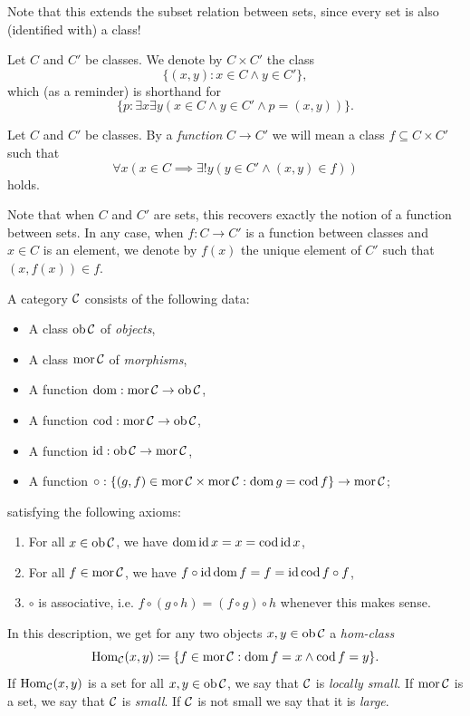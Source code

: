 Note that this extends the subset relation between sets, since every set is also (identified with) a class!

\begin{definition}\label{def:appendix:size issues:product of classes}
    Let $C$ and $C'$ be classes. We denote by $C \times C'$ the class
    \[\{(x,y) : x \in C \land y \in C'\},\]
    which (as a reminder) is shorthand for
    \[\{p : \exists x \exists y (x \in C \land y \in C' \land p = (x,y))\}.\]
\end{definition}

\begin{definition}\label{def:appendix:size issues:function between classes}
    Let $C$ and $C'$ be classes. By a \emph{function} $C \to C'$ we will mean a class $f \subseteq C \times C'$ such that
    \[\forall x (x \in C \implies \exists! y (y \in C' \land (x,y) \in f))\]
    holds.
\end{definition}

Note that when $C$ and $C'$ are sets, this recovers exactly the notion of a function between sets. In any case, when $f : C \to C'$ is a function between classes and $x \in C$ is an element, we denote by $f(x)$ the unique element of $C'$ such that $(x,f(x)) \in f$.

\begin{definition}\label{def:appendix:size issues:category version 1}
    A category $\mathcal{C}$ consists of the following data:
    \begin{itemize}
        \item A class $\operatorname{ob} \mathcal{C}$ of \emph{objects},
        \item A class $\operatorname{mor} \mathcal{C}$ of \emph{morphisms},
        \item A function $\operatorname{dom} : \operatorname{mor} \mathcal{C} \to \operatorname{ob} \mathcal{C}$,
        \item A function $\operatorname{cod} : \operatorname{mor} \mathcal{C} \to \operatorname{ob} \mathcal{C}$,
        \item A function $\operatorname{id} : \operatorname{ob} \mathcal{C} \to \operatorname{mor} \mathcal{C}$,
        \item A function $\circ : \{(g,f) \in \operatorname{mor} \mathcal{C} \times \operatorname{mor} \mathcal{C} : \operatorname{dom} g = \operatorname{cod} f\} \to \operatorname{mor} \mathcal{C}$;
    \end{itemize}
    satisfying the following axioms:
    \begin{enumerate}
        \item For all $x \in \operatorname{ob} \mathcal{C}$, we have $\operatorname{dom} \operatorname{id} x = x = \operatorname{cod} \operatorname{id} x$,
        \item For all $f \in \operatorname{mor} \mathcal{C}$, we have $f \circ \operatorname{id} \operatorname{dom} f = f = \operatorname{id} \operatorname{cod} f \circ f$,
        \item $\circ$ is associative, i.e. $f \circ (g \circ h) = (f \circ g) \circ h$ whenever this makes sense.
    \end{enumerate}
    In this description, we get for any two objects $x,y \in \operatorname{ob} \mathcal{C}$ a \emph{hom-class}
    \[\operatorname{Hom}_{\mathcal{C}}(x,y) \mathrel{\mathop{:}}\mathrel{\mkern-1.2mu}= \{f \in \operatorname{mor} \mathcal{C} : \operatorname{dom} f = x \land \operatorname{cod} f = y\}.\]
    If $\operatorname{Hom}_{\mathcal{C}}(x,y)$ is a set for all $x, y \in \operatorname{ob} \mathcal{C}$, we say that $\mathcal{C}$ is \emph{locally small}. If $\operatorname{mor} \mathcal{C}$ is a set, we say that $\mathcal{C}$ is \emph{small}. If $\mathcal{C}$ is not small we say that it is \emph{large}.
\end{definition}

